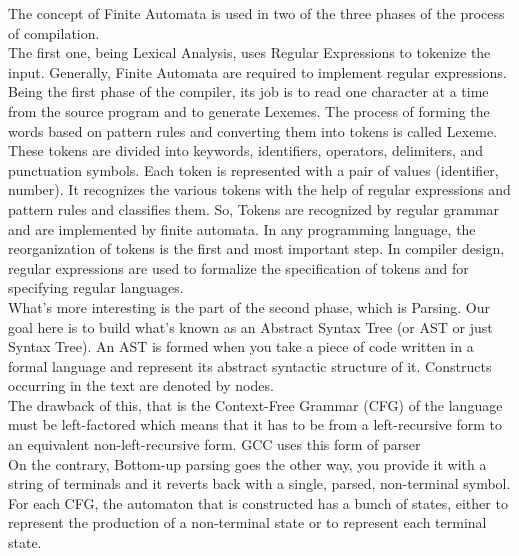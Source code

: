 \documentclass[12pt]{article}
\begin{document}
\par
The concept of Finite Automata is used in two of the three phases of the process of compilation.
\\
The first one, being Lexical Analysis, uses Regular Expressions to tokenize the input. Generally, Finite Automata are required to implement regular expressions. Being the first phase of the compiler, its job is to read one character at a time from the source program and to generate Lexemes. The process of forming the words based on pattern rules and converting them into tokens is called Lexeme. These tokens are divided into keywords, identifiers, operators, delimiters, and punctuation symbols. Each token is represented with a pair of values (identifier, number). It recognizes the various tokens with the help of regular expressions and pattern rules and classifies them. So, Tokens are recognized by regular grammar and are implemented by finite automata. In any programming language, the reorganization of tokens is the first and most important step. In compiler design, regular expressions are used to formalize the specification of tokens and for specifying regular languages.
\\
What’s more interesting is the part of the second phase, which is Parsing. Our goal here is to build what’s known as an Abstract Syntax Tree (or AST or just Syntax Tree). An AST is formed when you take a piece of code written in a formal language and represent its abstract syntactic structure of it. Constructs occurring in the text are denoted by nodes.
\\
The drawback of this, that is the Context-Free Grammar (CFG) of the language must be left-factored which means that it has to be from a left-recursive form to an equivalent non-left-recursive form. GCC uses this form of parser
\\
On the contrary, Bottom-up parsing goes the other way, you provide it with a string of terminals and it reverts back with a single, parsed, non-terminal symbol. For each CFG, the automaton that is constructed has a bunch of states, either to represent the production of a non-terminal state or to represent each terminal state.
\end{document}

